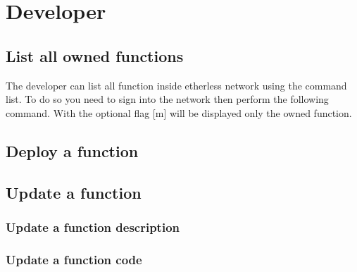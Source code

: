\section{Developer}

\subsection{List all owned functions}
The developer can list all function inside etherless network using the command list. To do so you need to sign into the network then perform the following command.
\newline With the optional flag [m] will be displayed only the owned function.

\subsection{Deploy a function}

\subsection{Update a function}

\subsubsection{Update a function description}

\subsubsection{Update a function code}
